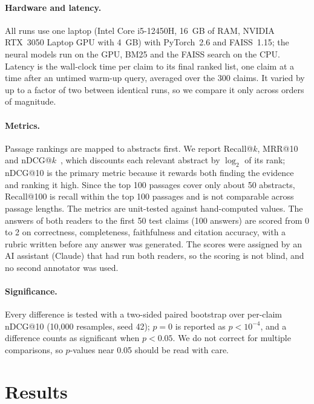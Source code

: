 \documentclass[runningheads]{llncs}
\begin{document}
\paragraph{Hardware and latency.} All runs use one laptop (Intel Core i5-12450H,
16~GB of RAM, NVIDIA RTX~3050 Laptop GPU with 4~GB) with PyTorch~2.6 and
FAISS~1.15; the neural models run on the GPU, BM25 and the FAISS search on the
CPU. Latency is the wall-clock time per claim to its final ranked list, one claim
at a time after an untimed warm-up query, averaged over the 300 claims. It varied
by up to a factor of two between identical runs, so we compare it only across
orders of magnitude.

\paragraph{Metrics.} Passage rankings are mapped to abstracts first. We report
Recall@$k$, MRR@10 and nDCG@$k$~\cite{jarvelin2002ndcg}, which discounts each
relevant abstract by $\log_2$ of its rank; nDCG@10 is the primary metric because
it rewards both finding the evidence and ranking it high. Since the top 100
passages cover only about 50 abstracts, Recall@100 is recall within the top 100
passages and is not comparable across passage lengths. The metrics are unit-tested
against hand-computed values. The answers of both readers to the first 50 test
claims (100 answers) are scored from 0 to 2 on correctness, completeness,
faithfulness and citation accuracy, with a rubric written before any answer was
generated. The scores were assigned by an AI assistant (Claude) that had run both
readers, so the scoring is not blind, and no second annotator was used.

\paragraph{Significance.} Every difference is tested with a two-sided paired
bootstrap over per-claim nDCG@10 (10{,}000 resamples, seed 42); $p=0$ is reported
as $p<10^{-4}$, and a difference counts as significant when $p<0.05$. We do not
correct for multiple comparisons, so $p$-values near 0.05 should be read with care.

\section{Results}
\label{sec:results}
\end{document}
